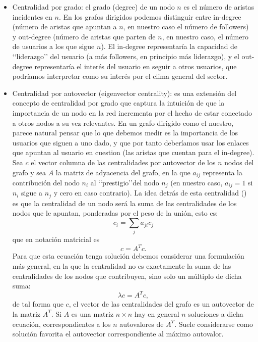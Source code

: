 \begin{itemize}
\item Centralidad por grado: el grado (degree) de un nodo $n$ es el número de aristas 
incidentes en $n$. En los grafos dirigidos podemos distinguir entre in-degree (número
de aristas que apuntan a $n$, en nuestro caso el número de followers) y
out-degree (número de aristas que parten de $n$, en nuestro caso, el número de
usuarios a los que sigue $n$). El in-degree representaría la capacidad de 
\lq\lq liderazgo\rq\rq
del usuario (a más followers, en principio más liderazgo), y el out-degree 
representaría el interés del usuario en seguir a otros usuarios, que podríamos
interpretar como su interés por el clima general del sector.
\item Centralidad por autovector (eigenvector centrality): es una extensión del 
concepto de cen\-tra\-li\-dad por grado que captura la intuición de que la importancia 
de un nodo en la red incrementa por el hecho de estar conectado a otros nodos 
a su vez relevantes. En un grafo dirigido como el nuestro, parece natural pensar que
lo que debemos medir es la importancia de los usuarios que siguen a uno dado,
y que por tanto deberíamos usar los enlaces que apuntan al usuario en cuestion (las 
aristas que cuentan para el in-degree).  Sea $c$ el vector columna
de las centralidades por autovector de los $n$ nodos del grafo y sea $A$ la matriz
de adyacencia del grafo, en la que $a_{ij}$ representa la contribución
del nodo $n_i$ al \lq\lq prestigio\rq\rq del nodo $n_j$ (en nuestro caso, $a_{ij} = 1$ si
$n_i$ sigue a $n_j$ y cero en caso contrario). La idea detrás de esta centralidad
(\cite{bonacich2}) es que la centralidad de un nodo será la suma de las centralidades
de los nodos que le apuntan, ponderadas por el peso de la unión, esto es:
$$c_i = \sum_j a_{ji} c_j$$
que en notación matricial es 
$$c = A^Tc.$$
Para que esta ecuación tenga solución debemos considerar una formulación más general,
en la que la centralidad no es exactamente la suma de las centralidades de los nodos que 
contribuyen, sino solo un múltiplo de dicha suma:
$$\lambda c = A^Tc,$$
de tal forma que $c$, el vector de las centralidades del grafo es un 
autovector de la matriz $A^T$. Si $A$ es una matriz $n\times n$ hay en general $n$ soluciones
a dicha ecuación, correspondientes a los $n$ autovalores de $A^T$. Suele considerarse
como solución favorita el autovector correspondiente al máximo autovalor.
 

\end{itemize}
